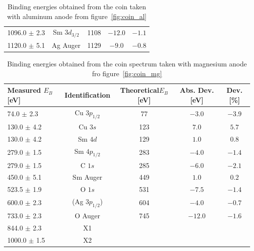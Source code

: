 \documentclass[a4paper,10pt]{scrartcl}
\begin{document}
\begin{table}[h]
\begin{center}
\begin{tabular}{lcccc}
1096.0 $\pm$ 2.3           & Sm $3d_{3/2}$  & 1108                    & $-12.0$        & $-1.1$   \\
1120.0 $\pm$ 5.1           & Ag Auger       & 1129                    & $-9.0$         & $-0.8$   \\
\bottomrule
\end{tabular}
\end{center}
\par
\caption{Binding energies obtained from the coin taken with aluminum anode from figure~\ref{fig:coin_al} \label{tab:coin_al_ident}}
\end{table}

\begin{table}[h]
\begin{center}
\begin{tabular}{lcccc}
\toprule
Measured $E_{B}$ [eV]      & Identification  & Theoretical$E_{B}$ [eV] & Abs. Dev. [eV] & Dev. [\%]\\
\midrule
\phantom{00}74.0 $\pm$ 2.3 & Cu $3p_{1/2}$   & 77                      & $-3.0$         & $-3.9$\\
\phantom{0}130.0 $\pm$ 4.2 & Cu $3s$         & 123                     & $7.0$          & $5.7$ \\
\phantom{0}130.0 $\pm$ 4.2 & Sm $4d$         & 129                     & $1.0$          & $0.8$ \\
\phantom{0}279.0 $\pm$ 1.5 & Sm $4p_{1/2}$   & 283                     & $-4.0$         & $-1.4$\\
\phantom{0}279.0 $\pm$ 1.5 & C $1s$          & 285                     & $-6.0$         & $-2.1$\\
\phantom{0}450.0 $\pm$ 5.1 & Sm Auger        & 449                     & $1.0$          & $0.2$ \\
\phantom{0}523.5 $\pm$ 1.9 & O $1s$          & 531                     & $-7.5$         & $-1.4$\\
\phantom{0}600.0 $\pm$ 2.3 & (Ag $3p_{1/2}$) & 604                     & $-4.0$         & $-0.7$\\
\phantom{0}733.0 $\pm$ 2.3 & O Auger         & 745                     & $-12.0$        & $-1.6$\\
\phantom{0}844.0 $\pm$ 2.3 & X1              &                         &                &       \\
1000.0 $\pm$ 1.5           & X2              &                         &                &       \\
\bottomrule
\end{tabular}
\end{center}
\par
\caption{Binding energies obtained from the coin spectrum taken with magnesium anode fro figure~\ref{fig:coin_mg} \label{tab:coin_mg_ident}}
\end{table}
\end{document}

